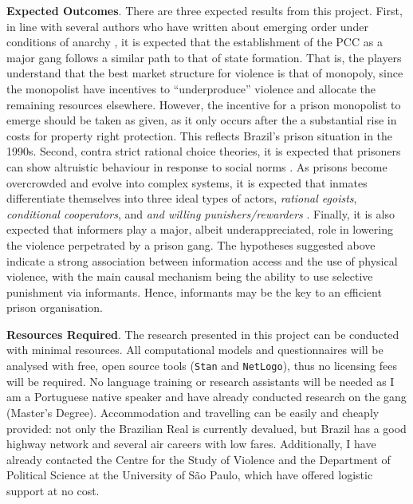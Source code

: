 \documentclass[a4paper,11pt]{article}
\begin{document}
\noindent \textbf{Expected Outcomes}. There are three expected results from this project. First, in line with several authors who have written about emerging order under conditions of anarchy \citep{buchanan1975limits, nozick1974anarchy}, it is expected that the establishment of the PCC as a major gang follows a similar path to that of state formation. That is, the players understand that the best market structure for violence is that of monopoly, since the monopolist have incentives to ``underproduce'' violence and allocate the remaining resources elsewhere. However, the incentive for a prison monopolist to emerge should be taken as given, as it only occurs after the a substantial rise in costs for property right protection. This reflects Brazil's prison situation in the 1990s. Second, contra strict rational choice theories, it is expected that prisoners can show altruistic behaviour in response to social norms \citep{skarbek2012prison}. As prisons become overcrowded and evolve into complex systems, it is expected that inmates differentiate themselves into three ideal types of actors, \textit{rational egoists}, \textit{conditional cooperators}, and \textit{and willing punishers/rewarders} \citep{ostrom2000collective}. Finally, it is also expected that informers play a major, albeit underappreciated, role in lowering the violence perpetrated by a prison gang. The hypotheses suggested above indicate a strong association between information access and the use of physical violence, with the main causal mechanism being the ability to use selective punishment via informants. Hence, informants may be the key to an efficient prison organisation.

\vspace{.45cm}

\noindent \textbf{Resources Required}. The research presented in this project can be conducted with minimal resources. All computational models and questionnaires will be analysed with free, open source tools (\texttt{Stan} and \texttt{NetLogo}), thus no licensing fees will be required. No language training or research assistants will be needed as I am a Portuguese native speaker and have already conducted research on the gang (Master's Degree). Accommodation and travelling can be easily and cheaply provided: not only the Brazilian Real is currently devalued, but Brazil has a good highway network and several air careers with low fares. Additionally, I have already contacted the Centre for the Study of Violence and the Department of Political Science at the University of São Paulo, which have offered logistic support at no cost.

\newpage


\end{document}
